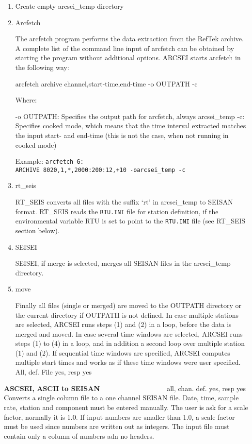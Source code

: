 \begin{enumerate}
\item Create empty arcsei\_temp directory 
\item Arcfetch 

The arcfetch program performs the data extraction from the RefTek 
archive. A complete list of the command line input of arcfetch can 
be obtained by starting the program without additional options. 
ARCSEI starts arcfetch in the following way: 

arcfetch archive channel,start-time,end-time -o OUTPATH -c 

Where:  

-o OUTPATH:  Specifies the output path for arcfetch, always arcsei\_temp   \newline
-c:  Specifies cooked mode, which means that the time interval extracted   
matches the input start- and end-time (this is not the case, when not running in  
cooked mode)  

Example:  \newline
\texttt{arcfetch G:\\ARCHIVE 8020,1,*,2000:200:12,+10 -oarcsei\_temp -c}
\item rt\_seis 

RT\_SEIS converts all files with the suffix `rt' in arcsei\_temp to SEISAN format. RT\_SEIS reads the \texttt{RTU.INI} file for station definition, if the environmental variable RTU is set to point to the \texttt{RTU.INI} file (see RT\_SEIS section below). 
\item SEISEI 

SEISEI, if merge is selected, merges all SEISAN files in the arcsei\_temp directory. 

\item move 

Finally all files (single or merged) are moved to the OUTPATH directory or the current directory if OUTPATH is not defined. In case multiple stations are selected, ARCSEI runs steps (1) and (2) in a loop, before the data is merged and moved. In case several time windows are selected, ARCSEI runs steps (1) to (4) in a loop, and in addition a second loop over multiple station (1) and (2). If sequential time windows are specified, ARCSEI computes multiple start times and works as if these time windows were user specified. All, def. File yes, resp yes 
\end{enumerate}

\textbf{ASCSEI, ASCII to SEISAN} \verb|                  | all, chan. def. yes, resp yes\newline
{}
Converts a single column file to a one channel SEISAN file. Date, time, sample rate, station and component must be entered manually. The user is ask for a scale factor, normally it is 1.0. If input numbers are smaller than 1.0, a scale factor must be used since numbers are written out as integers. The input file must contain only a column of numbers adn no headers. 

